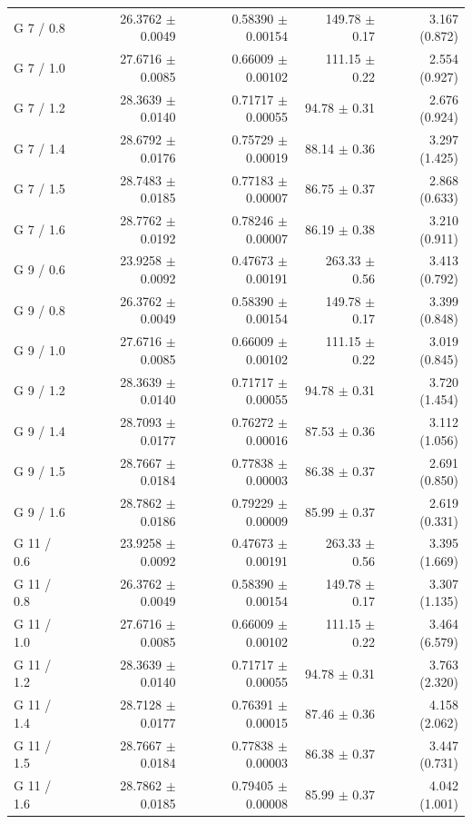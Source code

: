 \begin{longtable}{lrrrr}
G 7 / 0.8 & 26.3762 $\pm$ 0.0049 & 0.58390 $\pm$ 0.00154 & 149.78 $\pm$ 0.17 & 3.167 (0.872) \\
G 7 / 1.0 & 27.6716 $\pm$ 0.0085 & 0.66009 $\pm$ 0.00102 & 111.15 $\pm$ 0.22 & 2.554 (0.927) \\
G 7 / 1.2 & 28.3639 $\pm$ 0.0140 & 0.71717 $\pm$ 0.00055 & 94.78 $\pm$ 0.31 & 2.676 (0.924) \\
G 7 / 1.4 & 28.6792 $\pm$ 0.0176 & 0.75729 $\pm$ 0.00019 & 88.14 $\pm$ 0.36 & 3.297 (1.425) \\
G 7 / 1.5 & 28.7483 $\pm$ 0.0185 & 0.77183 $\pm$ 0.00007 & 86.75 $\pm$ 0.37 & 2.868 (0.633) \\
G 7 / 1.6 & 28.7762 $\pm$ 0.0192 & 0.78246 $\pm$ 0.00007 & 86.19 $\pm$ 0.38 & 3.210 (0.911) \\
G 9 / 0.6 & 23.9258 $\pm$ 0.0092 & 0.47673 $\pm$ 0.00191 & 263.33 $\pm$ 0.56 & 3.413 (0.792) \\
G 9 / 0.8 & 26.3762 $\pm$ 0.0049 & 0.58390 $\pm$ 0.00154 & 149.78 $\pm$ 0.17 & 3.399 (0.848) \\
G 9 / 1.0 & 27.6716 $\pm$ 0.0085 & 0.66009 $\pm$ 0.00102 & 111.15 $\pm$ 0.22 & 3.019 (0.845) \\
G 9 / 1.2 & 28.3639 $\pm$ 0.0140 & 0.71717 $\pm$ 0.00055 & 94.78 $\pm$ 0.31 & 3.720 (1.454) \\
G 9 / 1.4 & 28.7093 $\pm$ 0.0177 & 0.76272 $\pm$ 0.00016 & 87.53 $\pm$ 0.36 & 3.112 (1.056) \\
G 9 / 1.5 & 28.7667 $\pm$ 0.0184 & 0.77838 $\pm$ 0.00003 & 86.38 $\pm$ 0.37 & 2.691 (0.850) \\
G 9 / 1.6 & 28.7862 $\pm$ 0.0186 & 0.79229 $\pm$ 0.00009 & 85.99 $\pm$ 0.37 & 2.619 (0.331) \\
G 11 / 0.6 & 23.9258 $\pm$ 0.0092 & 0.47673 $\pm$ 0.00191 & 263.33 $\pm$ 0.56 & 3.395 (1.669) \\
G 11 / 0.8 & 26.3762 $\pm$ 0.0049 & 0.58390 $\pm$ 0.00154 & 149.78 $\pm$ 0.17 & 3.307 (1.135) \\
G 11 / 1.0 & 27.6716 $\pm$ 0.0085 & 0.66009 $\pm$ 0.00102 & 111.15 $\pm$ 0.22 & 3.464 (6.579) \\
G 11 / 1.2 & 28.3639 $\pm$ 0.0140 & 0.71717 $\pm$ 0.00055 & 94.78 $\pm$ 0.31 & 3.763 (2.320) \\
G 11 / 1.4 & 28.7128 $\pm$ 0.0177 & 0.76391 $\pm$ 0.00015 & 87.46 $\pm$ 0.36 & 4.158 (2.062) \\
G 11 / 1.5 & 28.7667 $\pm$ 0.0184 & 0.77838 $\pm$ 0.00003 & 86.38 $\pm$ 0.37 & 3.447 (0.731) \\
G 11 / 1.6 & 28.7862 $\pm$ 0.0185 & 0.79405 $\pm$ 0.00008 & 85.99 $\pm$ 0.37 & 4.042 (1.001) \\

\end{longtable}
